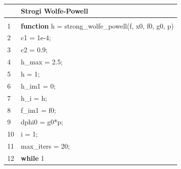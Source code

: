 \documentclass[bosnian,12pt,a4paper]{report}
\begin{document}
\begin{tabular}{ll}
   & Strogi Wolfe-Powell                                                                                 \\ \hline \\
1  & \textbf{function} h = strong\_wolfe\_powell(f, x0, f0, g0, p)                                                \\
2  & \hspace*{1cm}c1 = 1e-4;                                                                                          \\
3  & \hspace*{1cm}c2 = 0.9;                                                                                            \\
4  & \hspace*{1cm}h\_max = 2.5;                                                                                       \\
5  & \hspace*{1cm}h = 1;                                                                                           \\
6  & \hspace*{1cm}h\_im1 = 0;                                                                                         \\
7  & \hspace*{1cm}h\_i = h;                                                                                           \\
8  & \hspace*{1cm}f\_im1 = f0;                                                                                        \\
9  & \hspace*{1cm}dphi0 = g0*p;                                                                                       \\
10 & \hspace*{1cm}i = 1;                                                                                              \\
11 & \hspace*{1cm}max\_iters = 20;                                                                                    \\
12 & \hspace*{1cm}\textbf{while} 1                                                                                             \\

\end{tabular}
\end{document}
